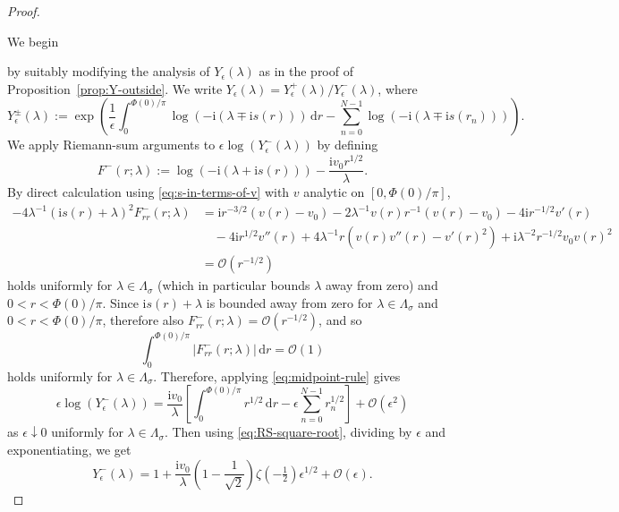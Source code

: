 \documentclass[12pt]{amsart}
\numberwithin{equation}{section}
\newcommand{\dd}{\mathrm{d}}
\newcommand{\ii}{\mathrm{i}}
\newcommand{\SP}{\lambda}
\newcommand{\phaseint}{\Phi}
\newcommand{\rr}{r}
\newcommand{\bigo}[1]{ \mathcal{O}\! \left( #1 \right) }
\begin{document}
\begin{proof}
\hypertarget{proof:Tbasicasymp}{We begin} by suitably modifying the analysis of $Y_\epsilon(\SP)$ as in the proof of Proposition~\ref{prop:Y-outside}.  We write $Y_\epsilon(\SP)=Y_\epsilon^+(\SP)/Y_\epsilon^-(\SP)$, where
\begin{equation}
Y_\epsilon^\pm(\SP):=
\exp\left(\frac{1}{\epsilon}\int_0^{\phaseint(0)/\pi}\log(-\ii(\SP\mp \ii s(\rr)))\,\dd \rr-\sum_{n=0}^{N-1}\log(-\ii(\SP \mp \ii s(\rr_n)))\right).
\end{equation}
We apply Riemann-sum arguments to $\epsilon\log(Y_\epsilon^-(\SP))$ by defining
\begin{equation}
F^-(\rr;\SP):=\log(-\ii(\SP+\ii s(\rr)))-\frac{\ii v_0\rr^{1/2}}{\SP}.
\end{equation}
By direct calculation using \eqref{eq:s-in-terms-of-v} with $v$ analytic on $[0,\phaseint(0)/\pi]$,
\begin{equation}
\begin{split}
-4\SP^{-1} (\ii s(\rr)+\SP)^2F_{\rr\rr}^-(\rr;\SP)&=
\ii \rr^{-3/2}(v(\rr)-v_0)-2\SP^{-1}v(\rr)\rr^{-1}(v(\rr)-v_0) - 4\ii \rr^{-1/2}v'(\rr)\\
&\quad{}-4\ii \rr^{1/2}v''(\rr)+4\SP^{-1}\rr(v(\rr)v''(\rr)-v'(\rr)^2)+\ii \SP^{-2}\rr^{-1/2}v_0v(\rr)^2\\
&=\bigo{\rr^{-1/2}}
\end{split}
\end{equation}
holds uniformly for $\SP\in\Lambda_\sigma$ (which in particular bounds $\SP$ away from zero) and $0<\rr<\phaseint(0)/\pi$.  Since $\ii s(\rr)+\SP$ is bounded away from zero for $\SP\in\Lambda_\sigma$ and $0<\rr<\phaseint(0)/\pi$, therefore
also $F_{\rr\rr}^-(\rr;\SP)=\bigo{\rr^{-1/2}}$, and so
\begin{equation}
\int_0^{\phaseint(0)/\pi}|F_{\rr\rr}^-(\rr;\SP)|\,\dd \rr = \bigo{1}
\end{equation}
holds uniformly for $\SP\in\Lambda_\sigma$.
Therefore, applying \eqref{eq:midpoint-rule} gives
\begin{equation}
\epsilon \log(Y_\epsilon^-(\SP))=\frac{\ii v_0}{\SP}\left[\int_0^{\phaseint(0)/\pi}\rr^{1/2}\,\dd \rr - 
\epsilon\sum_{n=0}^{N-1}\rr_n^{1/2}\right] + 
\bigo{\epsilon^2}
\end{equation}
as $\epsilon\downarrow 0$ 
uniformly for $\SP\in \Lambda_\sigma$.
Then using \eqref{eq:RS-square-root}, dividing by $\epsilon$ and exponentiating, we get 
\begin{equation}
Y_\epsilon^-(\SP)=1+\frac{\ii v_0}{\SP}\left(1-\frac{1}{\sqrt{2}}\right)\zeta(-\tfrac{1}{2})\epsilon^{1/2}+\bigo{\epsilon}.
\label{eq:Y-minus-estimate}
\end{equation}


\end{proof}
\end{document}
